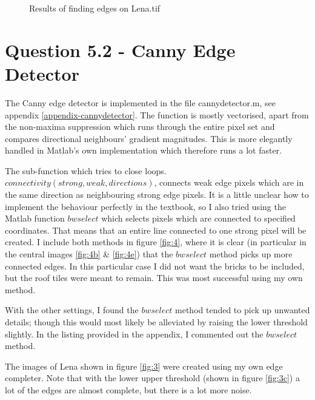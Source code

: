 \documentclass[a4paper]{article}
\begin{document}
\begin{figure}
\begin{subfigure}[b]{0.3\textwidth}
        \end{subfigure}
        
        \caption{Results of finding edges on Lena.tif}        
        \label{fig:2}
\end{figure}


\clearpage
\section*{Question 5.2 - Canny Edge Detector}
The Canny edge detector is implemented in the file cannydetector.m, see appendix \ref{appendix-cannydetector}. The function is mostly vectorised, apart from the non-maxima suppression which runs through the entire pixel set and compares directional neighbours' gradient magnitudes. This is more elegantly handled in Matlab's own implementation which therefore runs a lot faster.

The sub-function which tries to close loops. $connectivity(strong,weak,directions)$, connects weak edge pixels which are in the same direction as neighbouring strong edge pixels.
It is a little unclear how to implement the behaviour perfectly in the textbook, so I also tried using the Matlab function $bwselect$ which selects pixels which are connected to specified coordinates. That means that an entire line connected to one strong pixel will be created. I include both methods in figure \ref{fig:4}, where it is clear (in particular in the central images \ref{fig:4b} \& \ref{fig:4e}) that the $bwselect$ method picks up more connected edges. In this particular case I did not want the bricks to be included, but the roof tiles were meant to remain. This was most successful using my own method. 

With the other settings, I found the $bwselect$ method tended to pick up unwanted details; though this would most likely be alleviated by raising the lower threshold slightly. In the listing provided in the appendix, I commented out the $bwselect$ method. 

The images of Lena shown in figure \ref{fig:3} were created using my own edge completer. Note that with the lower upper threshold (shown in figure \ref{fig:3c}) a lot of the edges are almost complete, but there is a lot more noise.
\end{document}
